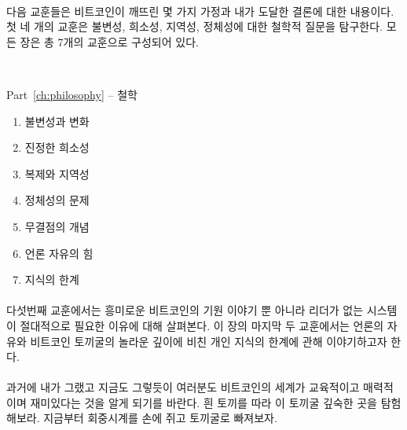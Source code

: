 \paragraph{}
다음 교훈들은 비트코인이 깨뜨린 몇 가지 가정과 내가 도달한 결론에 대한 내용이다. 
첫 네 개의 교훈은 불변성, 희소성, 지역성, 정체성에 대한 철학적 질문을 탐구한다. 
모든 장은 총 7개의 교훈으로 구성되어 있다.

~

\begin{samepage}
	Part~\ref{ch:philosophy} -- 철학
	
	\begin{enumerate}
		\item 불변성과 변화
		\item 진정한 희소성
		\item 복제와 지역성
		\item 정체성의 문제
		\item 무결점의 개념
		\item 언론 자유의 힘
		\item 지식의 한계
	\end{enumerate}
\end{samepage}

\paragraph{}
다섯번째 교훈에서는 흥미로운 비트코인의 기원 이야기 뿐 아니라 리더가 없는 시스템이 절대적으로 필요한 이유에 대해 살펴본다. 
이 장의 마지막 두 교훈에서는 언론의 자유와 비트코인 토끼굴의 놀라운 깊이에 비친 개인 지식의 한계에 관해 이야기하고자 한다. 
 
\paragraph{}
과거에 내가 그랬고 지금도 그렇듯이 여러분도 비트코인의 세계가 교육적이고 매력적이며 재미있다는 것을 알게 되기를 바란다. 
흰 토끼를 따라 이 토끼굴 깊숙한 곳을 탐험해보라. 지금부터 회중시계를 손에 쥐고 토끼굴로 빠져보자.
